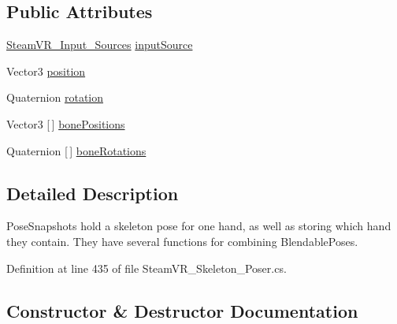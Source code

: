 \subsection*{Public Attributes}
\begin{DoxyCompactItemize}
\item 
\mbox{\hyperlink{namespace_valve_1_1_v_r_a82e5bf501cc3aa155444ee3f0662853f}{Steam\+V\+R\+\_\+\+Input\+\_\+\+Sources}} \mbox{\hyperlink{class_valve_1_1_v_r_1_1_steam_v_r___skeleton___pose_snapshot_a35eb6996e041716c663bcca59bdfb5c5}{input\+Source}}
\item 
Vector3 \mbox{\hyperlink{class_valve_1_1_v_r_1_1_steam_v_r___skeleton___pose_snapshot_a91722317a4e8a3b7d195673b3182c791}{position}}
\item 
Quaternion \mbox{\hyperlink{class_valve_1_1_v_r_1_1_steam_v_r___skeleton___pose_snapshot_af35f878f7dde9abce93c51736d937418}{rotation}}
\item 
Vector3 \mbox{[}$\,$\mbox{]} \mbox{\hyperlink{class_valve_1_1_v_r_1_1_steam_v_r___skeleton___pose_snapshot_a6d94712e65f3d5ae50dfbf4753c16514}{bone\+Positions}}
\item 
Quaternion \mbox{[}$\,$\mbox{]} \mbox{\hyperlink{class_valve_1_1_v_r_1_1_steam_v_r___skeleton___pose_snapshot_a68d34185bca4ac4bf1921b40054b348c}{bone\+Rotations}}
\end{DoxyCompactItemize}


\subsection{Detailed Description}
Pose\+Snapshots hold a skeleton pose for one hand, as well as storing which hand they contain. They have several functions for combining Blendable\+Poses. 



Definition at line 435 of file Steam\+V\+R\+\_\+\+Skeleton\+\_\+\+Poser.\+cs.



\subsection{Constructor \& Destructor Documentation}
\mbox{\label{class_valve_1_1_v_r_1_1_steam_v_r___skeleton___pose_snapshot_ab25240c5aef693aeab7284d1b6a1b467}} 

